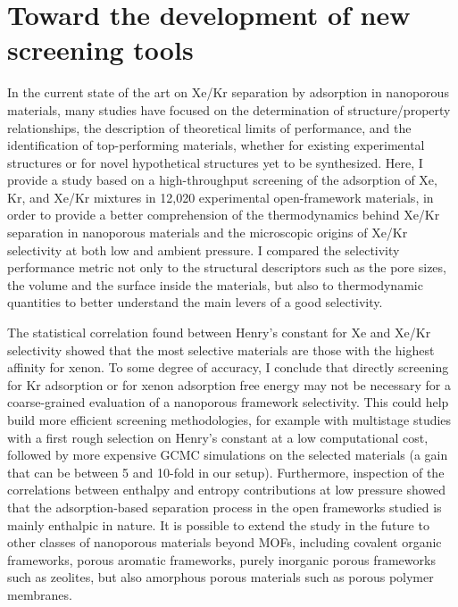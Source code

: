 \documentclass[main.tex]{subfiles}
\begin{document}
\section{Toward the development of new screening tools}

In the current state of the art on Xe/Kr separation by adsorption in nanoporous materials, many studies have focused on the determination of structure/property relationships, the description of theoretical limits of performance, and the identification of top-performing materials, whether for existing experimental structures or for novel hypothetical structures yet to be synthesized. Here, I provide a study based on a high-throughput screening of the adsorption of Xe, Kr, and Xe/Kr mixtures in 12,020 experimental open-framework materials, in order to provide a better comprehension of the thermodynamics behind Xe/Kr separation in nanoporous materials and the microscopic origins of Xe/Kr selectivity at both low and ambient pressure. I compared the selectivity performance metric  not only to the structural descriptors such as the pore sizes, the volume and the surface inside the materials, but also to thermodynamic quantities to better understand the main levers of a good selectivity.

The statistical correlation found between Henry's constant for Xe and Xe/Kr selectivity showed that the most selective materials are those with the highest affinity for xenon. To some degree of accuracy, I conclude that directly screening for Kr adsorption or for xenon adsorption free energy may not be necessary for a coarse-grained evaluation of a nanoporous framework selectivity. This could help build more efficient screening methodologies, for example with multistage studies with a first rough selection on Henry's constant at a low computational cost, followed by more expensive GCMC simulations on the selected materials (a gain that can be between 5 and 10-fold in our setup). Furthermore, inspection of the correlations between enthalpy and entropy contributions at low pressure showed that the adsorption-based separation process in the open frameworks studied is mainly enthalpic in nature. It is possible to extend the study in the future to other classes of nanoporous materials beyond MOFs, including covalent organic frameworks, porous aromatic frameworks, purely inorganic porous frameworks such as zeolites, but also amorphous porous materials such as porous polymer membranes.
\end{document}
